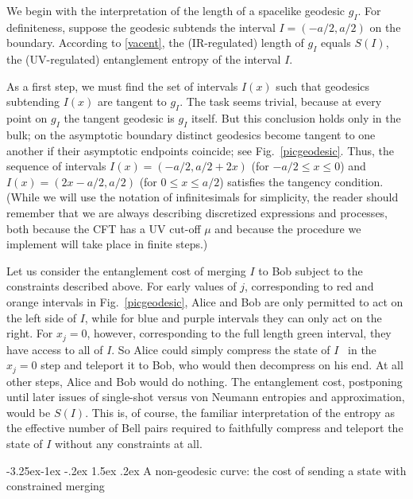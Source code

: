 \documentclass[12pt]{article}
\makeatletter
\renewcommand\subsection{\@startsection{subsection}{2}{\z@}%
                                     {-3.25ex\@plus -1ex \@minus -.2ex}%
                                     {1.5ex \@plus .2ex}%
                                     {\normalfont\bfseries}}
\makeatother
\begin{document}
We begin with the interpretation of the length of a spacelike geodesic $g_I$. For definiteness, suppose the geodesic subtends the interval $I = (-a/2, a/2)$ on the boundary. According to \eqref{vacent}, the (IR-regulated) length of $g_I$ equals $S(I)$, the (UV-regulated) entanglement entropy of the interval $I$.

As a first step, we must find the set of intervals $I(x)$ such that geodesics subtending $I(x)$ are tangent to $g_I$. The task seems trivial, because at every point on $g_I$ the tangent geodesic is $g_I$ itself. But this conclusion holds only in the bulk; on the asymptotic boundary distinct geodesics become tangent to one another if their asymptotic endpoints coincide; see Fig.~\ref{picgeodesic}. Thus, the sequence of intervals $I(x) = (-a/2, a/2 + 2x)$ (for $-a/2 \leq x \leq 0$) and $I(x) = (2x - a/2, a/2)$ (for $0 \leq x \leq a/2$) satisfies the tangency condition. (While we will use the notation of infinitesimals for simplicity, the reader should remember that we are always describing discretized expressions and processes, both because the CFT has a UV cut-off $\mu$ and because the procedure we implement will take place in finite steps.)

Let us consider the entanglement cost of merging $I$ to Bob subject to the constraints described above. For early values of $j$, corresponding to red and orange intervals in Fig.~\ref{picgeodesic}, Alice and Bob are only permitted to act on the left side of $I$, while for blue and purple intervals they can only act on the right. For $x_j =0$, however, corresponding to the full length green interval, they have access to all of $I$. So Alice could simply compress the state of $I$~\cite{schumacher} in the $x_j=0$ step and teleport it to Bob, who would then decompress on his end. At all other steps, Alice and Bob would do nothing. The entanglement cost, postponing until later issues of single-shot versus von Neumann entropies and approximation, would be $S(I)$.  This is, of course, the familiar interpretation of the entropy as the effective number of Bell pairs required to faithfully compress and teleport the state of $I$ without any constraints at all.


\subsection{A non-geodesic curve: the cost of sending a state with constrained merging}
\label{explnongeodesic}
\end{document}
